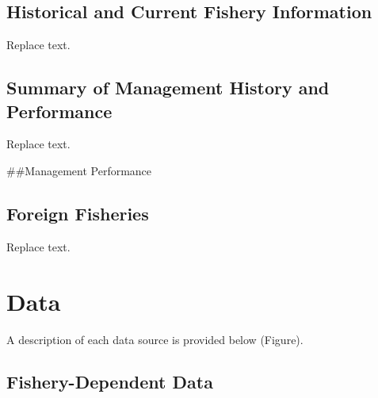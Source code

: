 \documentclass[11pt,
  english,
  a4paper,
]{article}
\begin{document}
\leavevmode\tagmcend\tagstructend


\hypertarget{historical-and-current-fishery-information}{%
\subsection{Historical and Current Fishery Information}\label{historical-and-current-fishery-information}}

\leavevmode\tagmcend\tagstructend

Replace text.


\hypertarget{summary-of-management-history-and-performance}{%
\subsection{Summary of Management History and Performance}\label{summary-of-management-history-and-performance}}

\leavevmode\tagmcend\tagstructend

Replace text.

\#\#Management Performance


\hypertarget{foreign-fisheries}{%
\subsection{Foreign Fisheries}\label{foreign-fisheries}}

\leavevmode\tagmcend\tagstructend

Replace text.


\hypertarget{data}{%
\section{Data}\label{data}}

\leavevmode\tagmcend\tagstructend

A description of each data source is provided below (Figure).


\hypertarget{fishery-dependent-data}{%
\subsection{Fishery-Dependent Data}\label{fishery-dependent-data}}
\end{document}
